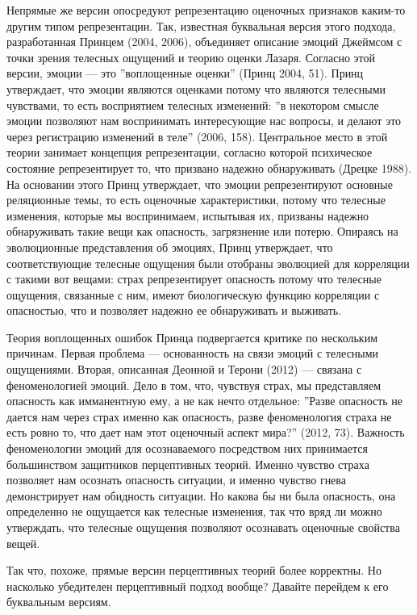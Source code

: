 \documentclass[11pt]{book}
\begin{document}
Непрямые же версии опосредуют репрезентацию оценочных признаков каким-то другим типом репрезентации. Так, известная буквальная версия этого подхода, разработанная Принцем (2004, 2006), объединяет описание эмоций Джеймсом с точки зрения телесных ощущений и теорию оценки Лазаря. Согласно этой версии, эмоции --- это ''воплощенные оценки'' (Принц 2004, 51). Принц утверждает, что эмоции являются оценками потому что являются телесными чувствами, то есть восприятием телесных изменений: ''в некотором смысле эмоции позволяют нам воспринимать интересующие нас вопросы, и делают это через регистрацию изменений в теле'' (2006, 158). Центральное место в этой теории занимает концепция репрезентации, согласно которой психическое состояние репрезентирует то, что призвано надежно обнаруживать (Дрецке 1988). На основании этого Принц утверждает, что эмоции репрезентируют основные реляционные темы, то есть оценочные характеристики, потому что телесные изменения, которые мы воспринимаем, испытывая их, призваны надежно обнаруживать такие вещи как опасность, загрязнение или потерю. Опираясь на эволюционные представления об эмоциях, Принц утверждает, что соответствующие телесные ощущения были отобраны эволюцией для корреляции с такими вот вещами: страх репрезентирует опасность потому что телесные ощущения, связанные с ним, имеют биологическую функцию корреляции с опасностью, что и позволяет надежно ее обнаруживать и выживать.

Теория воплощенных ошибок Принца подвергается критике по нескольким причинам. Первая проблема --- основанность на связи эмоций с телесными ощущениями. Вторая, описанная Деонной и Терони (2012) --- связана с феноменологией эмоций. Дело в том, что, чувствуя страх, мы представляем опасность как имманентную ему, а не как нечто отдельное: ''Разве опасность не дается нам через страх именно как опасность, разве феноменология страха не есть ровно то, что дает нам этот оценочный аспект мира?'' (2012, 73). Важность феноменологии эмоций для осознаваемого посредством них принимается большинством защитников перцептивных теорий. Именно чувство страха позволяет нам осознать опасность ситуации, и именно чувство гнева демонстрирует нам обидность ситуации. Но какова бы ни была опасность, она определенно не ощущается как телесные изменения, так что вряд ли можно утверждать, что телесные ощущения позволяют осознавать оценочные свойства вещей.

Так что, похоже, прямые версии перцептивных теорий более корректны. Но насколько убедителен перцептивный подход вообще? Давайте перейдем к его буквальным версиям.
\end{document}
